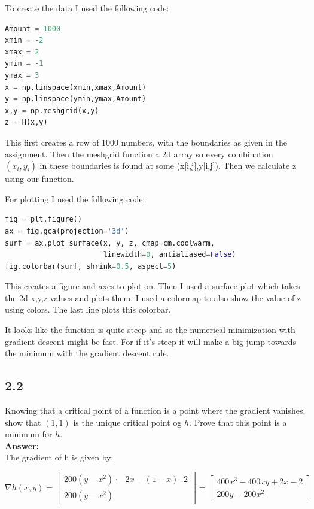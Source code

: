 \documentclass[a4paper]{article}
\begin{document}
To create the data I used the following code:

\begin{lstlisting}[language=Python]
Amount = 1000
xmin = -2
xmax = 2
ymin = -1
ymax = 3
x = np.linspace(xmin,xmax,Amount)
y = np.linspace(ymin,ymax,Amount)
x,y = np.meshgrid(x,y)
z = H(x,y)
\end{lstlisting}

This first creates a row of 1000 numbers, with the boundaries as given in the assignment. Then the meshgrid function a 2d array so every combination $(x_i,y_i)$ in these boundaries is found at some (x[i,j],y[i,j]). Then we calculate z using our function.

For plotting I used the following code:

\begin{lstlisting}[language=Python]
fig = plt.figure()
ax = fig.gca(projection='3d')
surf = ax.plot_surface(x, y, z, cmap=cm.coolwarm,
                       linewidth=0, antialiased=False)
fig.colorbar(surf, shrink=0.5, aspect=5)
\end{lstlisting}


This creates a figure and axes to plot on. Then I used a surface plot which takes the 2d x,y,z values and plots them. I used a colormap to also show the value of z using colors. The last line plots this colorbar.

It looks like the function is quite steep and so the numerical minimization with gradient descent might be fast. For if it's steep it will make a big jump towards the minimum with the gradient descent rule.

\subsection*{2.2}

Knowing that a critical point of a function is a point where the gradient vanishes, show that $(1,1)$ is the unique critical point og $h$. Prove that this point is a minimum for $h$.\\

\textbf{Answer:}\\

The gradient of h is given by:

\begin{equation}
\nabla h(x,y) = \begin{bmatrix}
200(y-x^2)\cdot -2x -(1-x)\cdot 2\\
200(y-x^2)
\end{bmatrix} = \begin{bmatrix}
400x^3-400xy+2x-2\\
200y-200x^2
\end{bmatrix}
\end{equation}
\end{document}
